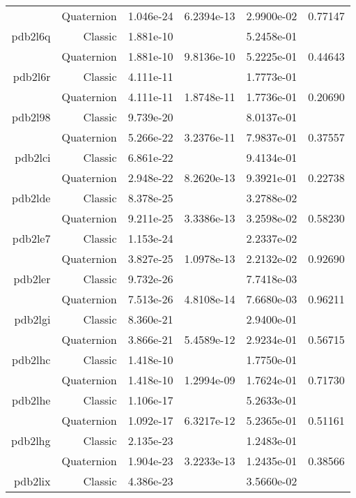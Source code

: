 \begin{xltabular}{\textwidth}{r|rS[table-format=1.3e+2]S[table-format=1.4e+2]S[table-format=1.4e+2]S[table-format=-1.5]}
& Quaternion & 1.046e-24 & 6.2394e-13 & 2.9900e-02 & 0.77147\\  \addlinespace
pdb2l6q & Classic & 1.881e-10 &  & 5.2458e-01 & \\
& Quaternion & 1.881e-10 & 9.8136e-10 & 5.2225e-01 & 0.44643\\  \addlinespace
pdb2l6r & Classic & 4.111e-11 &  & 1.7773e-01 & \\
& Quaternion & 4.111e-11 & 1.8748e-11 & 1.7736e-01 & 0.20690\\  \addlinespace
pdb2l98 & Classic & 9.739e-20 &  & 8.0137e-01 & \\
& Quaternion & 5.266e-22 & 3.2376e-11 & 7.9837e-01 & 0.37557\\  \addlinespace
pdb2lci & Classic & 6.861e-22 &  & 9.4134e-01 & \\
& Quaternion & 2.948e-22 & 8.2620e-13 & 9.3921e-01 & 0.22738\\  \addlinespace
pdb2lde & Classic & 8.378e-25 &  & 3.2788e-02 & \\
& Quaternion & 9.211e-25 & 3.3386e-13 & 3.2598e-02 & 0.58230\\  \addlinespace
pdb2le7 & Classic & 1.153e-24 &  & 2.2337e-02 & \\
& Quaternion & 3.827e-25 & 1.0978e-13 & 2.2132e-02 & 0.92690\\  \addlinespace
pdb2ler & Classic & 9.732e-26 &  & 7.7418e-03 & \\
& Quaternion & 7.513e-26 & 4.8108e-14 & 7.6680e-03 & 0.96211\\  \addlinespace
pdb2lgi & Classic & 8.360e-21 &  & 2.9400e-01 & \\
& Quaternion & 3.866e-21 & 5.4589e-12 & 2.9234e-01 & 0.56715\\  \addlinespace
pdb2lhc & Classic & 1.418e-10 &  & 1.7750e-01 & \\
& Quaternion & 1.418e-10 & 1.2994e-09 & 1.7624e-01 & 0.71730\\  \addlinespace
pdb2lhe & Classic & 1.106e-17 &  & 5.2633e-01 & \\
& Quaternion & 1.092e-17 & 6.3217e-12 & 5.2365e-01 & 0.51161\\  \addlinespace
pdb2lhg & Classic & 2.135e-23 &  & 1.2483e-01 & \\
& Quaternion & 1.904e-23 & 3.2233e-13 & 1.2435e-01 & 0.38566\\  \addlinespace
pdb2lix & Classic & 4.386e-23 &  & 3.5660e-02 & \\

\end{xltabular}
